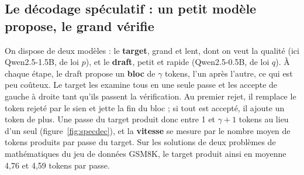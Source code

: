\documentclass[11pt,a4paper]{article}
\theoremstyle{plain}
\begin{document}
\subsection{Le décodage spéculatif : un petit modèle propose, le grand vérifie}\label{sec:specdec}
On dispose de deux modèles : le \textbf{target}, grand et lent, dont on veut la qualité (ici Qwen2.5-1.5B, de loi $p$), et le \textbf{draft}, petit et rapide (Qwen2.5-0.5B, de loi $q$).
À chaque étape, le draft propose un \textbf{bloc} de $\gamma$ tokens, l'un après l'autre, ce qui est peu coûteux.
Le target les examine tous en une seule passe et les accepte de gauche à droite tant qu'ils passent la vérification.
Au premier rejet, il remplace le token rejeté par le sien et jette la fin du bloc ; si tout est accepté, il ajoute un token de plus.
Une passe du target produit donc entre 1 et $\gamma+1$ tokens au lieu d'un seul (figure~\ref{fig:specdec}), et la \textbf{vitesse} se mesure par le nombre moyen de tokens produits par passe du target.
Sur les solutions de deux problèmes de mathématiques du jeu de données GSM8K, le target produit ainsi en moyenne 4,76 et 4,59 tokens par passe.
\end{document}
